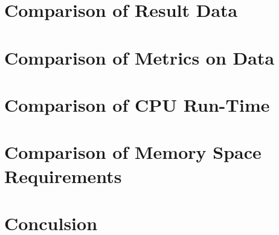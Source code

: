 \documentclass[ClusteringConnectionsMAIN.tex]{subfiles}
\begin{document}
%
%
\chapter{Comparison of Result Data}



%
%
\chapter{Comparison of Metrics on Data}



%
%
\chapter{Comparison of CPU Run-Time}



%
%
\chapter{Comparison of Memory Space Requirements}



%
%
\chapter{Conculsion}

\end{document}
